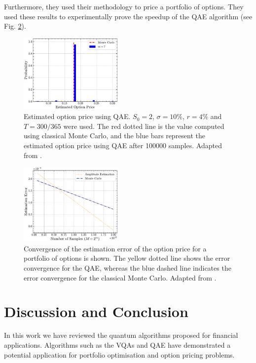 \documentclass[prx,twocolumn,floatfix,superscriptaddress,longbibliography]{revtex4-1}
\begin{document}
Furthermore, they used their methodology to price a portfolio of options. They used these results to experimentally prove the speedup of the QAE algorithm (see Fig. \ref{fig:portfolio-option}).

\begin{figure}[h!]
\centering
\includegraphics[width=0.45\textwidth]{option-price-estimation.pdf}
  \caption{\label{fig:results-qae} Estimated option price using QAE. $S_0 = 2$, $ \sigma = 10\%$, $r = 4\%$ and $T=300/365$ were used. The red dotted line is the value computed using classical Monte Carlo, and the blue bars represent the estimated option price using QAE after 100000 samples. Adapted  from \cite{Stamatopoulos2020}.}
\end{figure}

\begin{figure}[h!]
\centering
\includegraphics[width=0.45\textwidth]{estimation-error.pdf}
  \caption{\label{fig:portfolio-option} 
Convergence of the estimation error of the option price for a portfolio of options is shown. The yellow dotted line shows the error convergence for the QAE, whereas the blue dashed line indicates the error convergence for the classical Monte Carlo. Adapted  from \cite{Stamatopoulos2020}.}
\end{figure}

\section{Discussion and Conclusion}\label{sec:discussion}
In this work we have reviewed the quantum algorithms proposed for financial applications. Algorithms such as the VQAs and QAE have demonstrated a potential application for portfolio optimisation and option pricing problems. 
\end{document}
